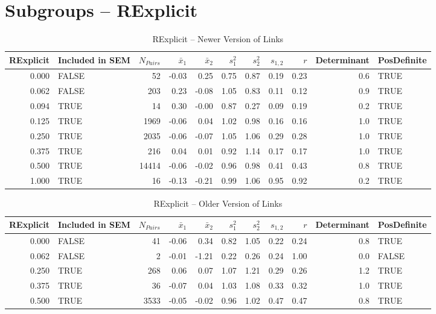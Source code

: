 \documentclass{article}\usepackage[]{graphicx}\usepackage[]{color}
\begin{document}
\section{Subgroups --  RExplicit }%
\begin{table}[ht]
\centering
\begin{tabular}{rlrrrrrrrrl}
  \hline
RExplicit & Included in SEM & $N_{Pairs}$ & $\bar{x}_1$ & $\bar{x}_2$ & $s_1^2$ & $s_2^2$ & $s_{1,2}$ & $r$ & Determinant & PosDefinite \\ 
  \hline
0.000 & FALSE & 52 & -0.03 & 0.25 & 0.75 & 0.87 & 0.19 & 0.23 & 0.6 & TRUE \\ 
  0.062 & FALSE & 203 & 0.23 & -0.08 & 1.05 & 0.83 & 0.11 & 0.12 & 0.9 & TRUE \\ 
  0.094 & TRUE & 14 & 0.30 & -0.00 & 0.87 & 0.27 & 0.09 & 0.19 & 0.2 & TRUE \\ 
  0.125 & TRUE & 1969 & -0.06 & 0.04 & 1.02 & 0.98 & 0.16 & 0.16 & 1.0 & TRUE \\ 
  0.250 & TRUE & 2035 & -0.06 & -0.07 & 1.05 & 1.06 & 0.29 & 0.28 & 1.0 & TRUE \\ 
  0.375 & TRUE & 216 & 0.04 & 0.01 & 0.92 & 1.14 & 0.17 & 0.17 & 1.0 & TRUE \\ 
  0.500 & TRUE & 14414 & -0.06 & -0.02 & 0.96 & 0.98 & 0.41 & 0.43 & 0.8 & TRUE \\ 
  1.000 & TRUE & 16 & -0.13 & -0.21 & 0.99 & 1.06 & 0.95 & 0.92 & 0.2 & TRUE \\ 
   \hline
\end{tabular}
\caption{RExplicit -- Newer Version of Links} 
\end{table}
\begin{table}[ht]
\centering
\begin{tabular}{rlrrrrrrrrl}
  \hline
RExplicit & Included in SEM & $N_{Pairs}$ & $\bar{x}_1$ & $\bar{x}_2$ & $s_1^2$ & $s_2^2$ & $s_{1,2}$ & $r$ & Determinant & PosDefinite \\ 
  \hline
0.000 & FALSE & 41 & -0.06 & 0.34 & 0.82 & 1.05 & 0.22 & 0.24 & 0.8 & TRUE \\ 
  0.062 & FALSE & 2 & -0.01 & -1.21 & 0.22 & 0.26 & 0.24 & 1.00 & 0.0 & FALSE \\ 
  0.250 & TRUE & 268 & 0.06 & 0.07 & 1.07 & 1.21 & 0.29 & 0.26 & 1.2 & TRUE \\ 
  0.375 & TRUE & 36 & -0.07 & 0.04 & 1.03 & 1.08 & 0.33 & 0.32 & 1.0 & TRUE \\ 
  0.500 & TRUE & 3533 & -0.05 & -0.02 & 0.96 & 1.02 & 0.47 & 0.47 & 0.8 & TRUE \\ 
   \hline
\end{tabular}
\caption{RExplicit -- Older Version of Links} 
\end{table}
\newpage 
\end{document}

